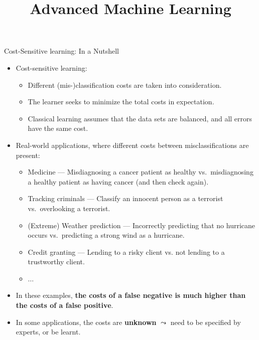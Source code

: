 \documentclass[11pt,compress,t,notes=noshow, xcolor=table]{beamer}
\title{Advanced Machine Learning}
\date{}
\begin{document}



\sloppy


\begin{vbframe}{Cost-Sensitive learning: In a Nutshell}
	\scriptsize{
		\begin{itemize}
%			
		\item Cost-sensitive learning: 
            \begin{itemize}
                \scriptsize
                \item Different (mis-)classification costs are taken into consideration.
                \item The learner seeks to minimize the total costs in expectation.
                \item Classical learning assumes that the data sets are balanced, and all errors have the same cost.
            \end{itemize}
		
%
		\item Real-world applications, where different costs between misclassifications are present:
%		
		\begin{itemize}
			\scriptsize
%			
			\item Medicine --- Misdiagnosing a cancer patient as healthy vs.\ misdiagnosing a healthy patient as having cancer (and then check again).
			\item Tracking criminals ---  Classify an innocent person as a terrorist vs.\ overlooking a terrorist.
			\item (Extreme) Weather prediction ---  Incorrectly predicting that no hurricane occurs vs.\ predicting a strong wind as a hurricane.
%			
			\item Credit granting --- Lending to a risky client vs. not lending to a trustworthy client.
			\item $\ldots$
%    	
%			
		\end{itemize}
%	
		\item In these examples, \textbf{the costs of a false negative is much higher than the costs of a false positive}.
        \item In some applications, the costs are \textbf{unknown} $\leadsto$ need to be specified by experts, or be learnt.
%
		\end{itemize}
		
	}
\end{vbframe}
\end{document}
